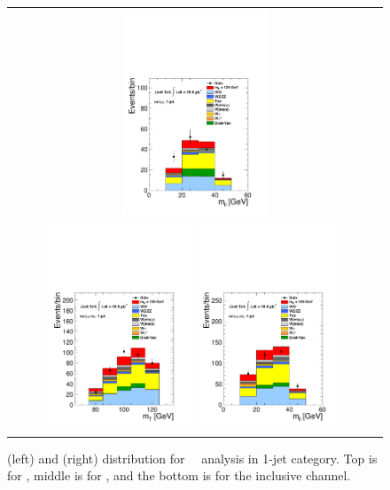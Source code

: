 \begin{figure}[htp]
\begin{tabular}{c}
\includegraphics[width=0.4\textwidth]{figures/hww_analysis17_125_ALL_sf_1j_mll.pdf}
\\
\includegraphics[width=0.4\textwidth]{figures/hww_analysis17_125_ALL_incl_1j_mt.pdf}
\includegraphics[width=0.4\textwidth]{figures/hww_analysis17_125_ALL_incl_1j_mll.pdf}
\end{tabular} 
\caption{ \mT(left) and \mll(right) distribution for ~\GeV\ analysis 
in 1-jet category. 
Top is for \DF, middle is for \SF, and the bottom is for the inclusive channel.}  
\label{fig:cutbased125_1jet} 
\end{figure} 

